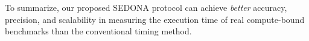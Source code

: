 \documentclass[letter]{ieice}
\begin{document}
To summarize, our proposed SEDONA protocol can achieve {\em better} accuracy,
precision, and scalability in measuring the execution time of real \hbox{compute-bound} benchmarks 
than the conventional timing method.

\vspace{-0.1in}
\begin{table}[h]
\centering
{
\scriptsize


}
\end{table}
\end{document}
